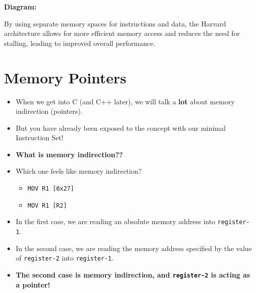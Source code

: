 \documentclass{report}
\begin{document}
\textbf{Diagram:}
\begin{center}
\end{center}

By using separate memory spaces for instructions and data, the Harvard architecture allows for more efficient memory access and reduces the need for stalling, leading to improved overall performance.

\section{Memory Pointers}

\begin{itemize}[left=0pt]
	\item When we get into C (and C++ later), we will talk a \textbf{lot} about memory indirection (pointers).
	\item But you have already been exposed to the concept with our minimal Instruction Set!
	\item \textbf{What is memory indirection??}
	\item Which one feels like memory indirection?
	      \begin{itemize}
		      \item \texttt{MOV R1 [0x27]}
		      \item \texttt{MOV R1 [R2]}
	      \end{itemize}
	\item In the first case, we are reading an absolute memory address into \texttt{register-1}.
	\item In the second case, we are reading the memory address specified by the value of \texttt{register-2} into \texttt{register-1}.
	\item \textbf{The second case is memory indirection, and \texttt{register-2} is acting as a pointer!}
\end{itemize}
\end{document}
